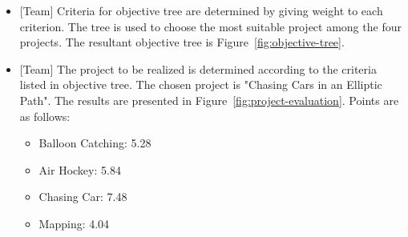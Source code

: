 \documentclass[a4paper,12pt]{article}
\begin{document}
\begin{itemize}
	
\item {[Team]} Criteria for objective tree are determined by giving weight to each criterion. The tree is used to choose the most suitable project among the four projects. The resultant objective tree is {Figure~\ref{fig:objective-tree}}.

\item {[Team]} The project to be realized is determined according to the criteria listed in objective tree. The chosen project is "Chasing Cars in an Elliptic Path". The results are presented in {Figure~\ref{fig:project-evaluation}}. Points are as follows:
\begin{itemize}
	\item Balloon Catching: 5.28
	\item Air Hockey: 5.84
	\item Chasing Car: 7.48
	\item Mapping: 4.04
\end{itemize}
 


\end{itemize}
\end{document}
